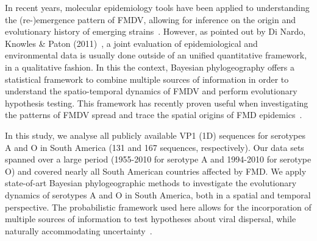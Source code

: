 \documentclass[10pt]{article}
\begin{document}
In recent years, molecular epidemiology tools have been applied to understanding the (re-)emergence pattern of FMDV, allowing for inference on the origin and evolutionary history of emerging strains~\cite{Perez2001,Malirat2007,andean,Malirat2011,Maradei2013}.
However, as pointed out by Di Nardo, Knowles \&  Paton (2011)~\cite{combining}, a joint evaluation of epidemiological and environmental data is usually done outside of an unified quantitative framework, in a qualitative fashion.
In this the context, Bayesian phylogeography offers a statistical framework to combine multiple sources of information in order to understand the spatio-temporal dynamics of FMDV and perform evolutionary hypothesis testing.
This framework has recently proven useful when investigating the patterns of FMDV spread and trace the spatial origins of FMD epidemics~\cite{Carvalho2013,bulgaria,phymal,hall2013}.


In this study, we analyse all publicly available VP1 (1D) sequences for serotypes A and O in South America (131 and 167 sequences, respectively).
Our data sets spanned over a large period (1955-2010 for serotype A and 1994-2010 for serotype O)  and covered nearly all South American countries affected by FMD.
We apply state-of-art Bayesian phylogeographic methods to investigate the evolutionary dynamics of serotypes A and O in South America, both in a spatial and temporal perspective.
The probabilistic framework used here allows for the incorporation of multiple sources of information to test hypotheses about viral dispersal, while naturally accommodating uncertainty~\cite{roots,towards}.
\end{document}
